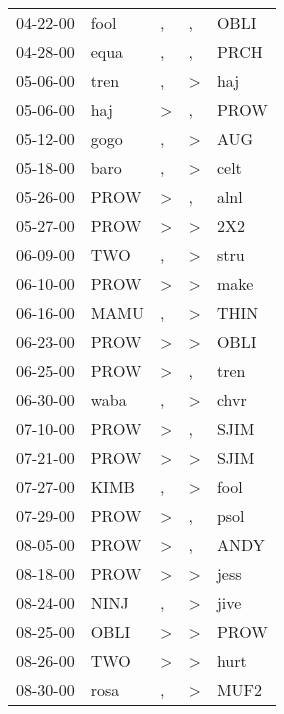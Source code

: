 \begin{supertabular}{lllll}
 04-22-00 &   fool &                , &                , &   OBLI \\
 04-28-00 &   equa &                , &                , &   PRCH \\
 05-06-00 &   tren &                , &     \textgreater &    haj \\
 05-06-00 &    haj &     \textgreater &                , &   PROW \\
 05-12-00 &   gogo &                , &     \textgreater &    AUG \\
 05-18-00 &   baro &                , &     \textgreater &   celt \\
 05-26-00 &   PROW &     \textgreater &                , &   alnl \\
 05-27-00 &   PROW &     \textgreater &     \textgreater &    2X2 \\
 06-09-00 &    TWO &                , &     \textgreater &   stru \\
 06-10-00 &   PROW &     \textgreater &     \textgreater &   make \\
 06-16-00 &   MAMU &                , &     \textgreater &   THIN \\
 06-23-00 &   PROW &     \textgreater &     \textgreater &   OBLI \\
 06-25-00 &   PROW &     \textgreater &                , &   tren \\
 06-30-00 &   waba &                , &     \textgreater &   chvr \\
 07-10-00 &   PROW &     \textgreater &                , &   SJIM \\
 07-21-00 &   PROW &     \textgreater &     \textgreater &   SJIM \\
 07-27-00 &   KIMB &                , &     \textgreater &   fool \\
 07-29-00 &   PROW &     \textgreater &                , &   psol \\
 08-05-00 &   PROW &     \textgreater &                , &   ANDY \\
 08-18-00 &   PROW &     \textgreater &     \textgreater &   jess \\
 08-24-00 &   NINJ &                , &     \textgreater &   jive \\
 08-25-00 &   OBLI &     \textgreater &     \textgreater &   PROW \\
 08-26-00 &    TWO &     \textgreater &     \textgreater &   hurt \\
 08-30-00 &   rosa &                , &     \textgreater &   MUF2 \\

\end{supertabular}
